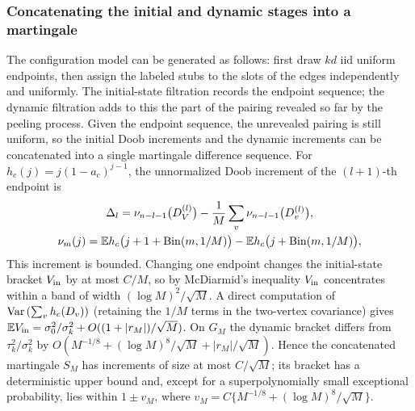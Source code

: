 \subsubsection{Concatenating the initial and dynamic stages into a martingale}
The configuration model can be generated as follows: first draw $kd$ iid uniform endpoints, then
assign the labeled stubs to the slots of the edges independently and uniformly. The initial-state
filtration records the endpoint sequence; the dynamic filtration adds to this the part of the
pairing revealed so far by the peeling process. Given the endpoint sequence, the unrevealed pairing
is still uniform, so the initial Doob increments and the dynamic increments can be concatenated
into a single martingale difference sequence. For $h_c(j)=j(1-a_c)^{j-1}$, the unnormalized Doob
increment of the $(l+1)$-th endpoint is
\begin{gather*}
\Delta_l=\nu_{n-l-1}\bigl(D_V^{(l)}\bigr)-\frac1M\sum_v\nu_{n-l-1}\bigl(D_v^{(l)}\bigr),\\
\nu_m(j)=\mathbb E h_c\bigl(j+1+\mathrm{Bin}(m,1/M)\bigr)-\mathbb E
h_c\bigl(j+\mathrm{Bin}(m,1/M)\bigr),
\end{gather*}
This increment is bounded. Changing one endpoint changes the initial-state bracket $V_{\rm in}$ by
at most $C/M$, so by McDiarmid's inequality $V_{\rm in}$ concentrates within a band of width
$(\log M)^2/\sqrt M$. A direct computation of $\operatorname{Var}\left(\sum_vh_c(D_v)\right)$ (retaining the
$1/M$ terms in the two-vertex covariance) gives
$\mathbb E V_{\rm in}=\sigma_0^2/\sigma_k^2+O((1+|r_M|)/\sqrt M)$. On $G_M$ the dynamic bracket differs
from $\tau_k^2/\sigma_k^2$ by $O(M^{-1/8}+(\log M)^8/\sqrt M+|r_M|/\sqrt M)$. Hence the
concatenated martingale $S_M$ has increments of size at most $C/\sqrt M$; its bracket has a
deterministic upper bound and, except for a superpolynomially small exceptional probability, lies
within $1\pm v_M$, where $v_M=C\{M^{-1/8}+(\log M)^8/\sqrt M\}$.

